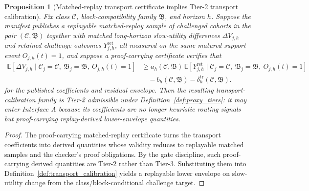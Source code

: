 \documentclass[11pt]{article}
\newtheorem{proposition}[theorem]{Proposition}
\theoremstyle{definition}
\newcommand{\E}{\mathbb{E}}
\newcommand{\1}{\mathbf{1}}
\begin{document}
\begin{proposition}[Matched-replay transport certificate implies Tier-2 transport calibration]\label{prop:transport_tier2}
Fix class $\mathcal C$, block-compatibility family $\mathfrak B$, and horizon $h$. Suppose the manifest publishes a replayable matched-replay sample of challenged cohorts in the pair $(\mathcal C,\mathfrak B)$ together with matched long-horizon slow-utility differences $\Delta V_{j,h}$ and retained challenge outcomes $Y_{j,h}^{\mathrm{ret}}$, all measured on the same matured support event $O_{j,h}(t)=1$, and suppose a proof-carrying certificate verifies that
\[
\begin{aligned}
\E[\Delta V_{j,h}\mid \mathcal C_j=\mathcal C,\ \mathfrak B_j=\mathfrak B,\ O_{j,h}(t)=1]
&\ge a_h(\mathcal C,\mathfrak B)\,\E[Y_{j,h}^{\mathrm{ret}}\mid \mathcal C_j=\mathcal C,\ \mathfrak B_j=\mathfrak B,\ O_{j,h}(t)=1]\\
&\quad -b_h(\mathcal C,\mathfrak B)-\delta_h^{\mathrm{tr}}(\mathcal C,\mathfrak B).
\end{aligned}
\]
for the published coefficients and residual envelope. Then the resulting transport-calibration family is Tier-2 admissible under Definition~\ref{def:proxy_tiers}: it may enter Interface A because its coefficients are no longer heuristic routing signals but proof-carrying replay-derived lower-envelope quantities.
\end{proposition}

\begin{proof}
The proof-carrying matched-replay certificate turns the transport coefficients into derived quantities whose validity reduces to replayable matched samples and the checker's proof obligations. By the gate discipline, such proof-carrying derived quantities are Tier-2 rather than Tier-3. Substituting them into Definition~\ref{def:transport_calibration} yields a replayable lower envelope on slow-utility change from the class/block-conditional challenge target.
\end{proof}
\end{document}
